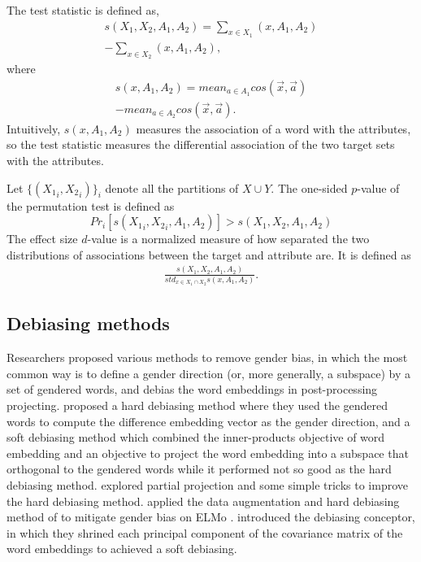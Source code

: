 The test statistic is defined as,
\begin{eqnarray}
s(X_1,X_2,A_1,A_2)=\sum_{x\in X_1}(x,A_1,A_2)\nonumber\\
-\sum_{x\in X_2}(x,A_1,A_2),\nonumber
\end{eqnarray}
where
\begin{eqnarray}
s(x,A_1,A_2)=mean_{a\in A_1}cos(\vec{x},\vec{a})\nonumber\\
-mean_{a\in A_2}cos(\vec{x},\vec{a}).\nonumber
\end{eqnarray}
Intuitively, $s(x,A_1,A_2)$ measures the association of a word with the attributes, so the test statistic measures the differential association of the two target sets with the attributes. 

Let $\{({X_1}_i,{X_2}_i)\}_{i}$ denote all the partitions of $X\cup Y$. The one-sided $p$-value of the permutation test is defined as $$Pr_i[s({X_1}_i,{X_2}_i,A_1,A_2)]>s(X_1,X_2,A_1,A_2)$$
The effect size $d$-value is a normalized measure of how separated the two distributions of associations between the target and attribute are. It is defined as
\begin{eqnarray}
\frac{s(X_1,X_2,A_1,A_2)}{std_{x\in X_1 \cap X_2}s(x,A_1,A_2)}.\nonumber
\end{eqnarray}

\subsection{Debiasing methods}
Researchers proposed various methods to remove gender bias, in which the most common way is to define a gender direction (or, more generally, a subspace) by a set of gendered words, and debias the word embeddings in post-processing projecting. \citet{bolukbasi2016man} proposed a hard debiasing method where they used the gendered words to compute the difference embedding vector as the gender direction, and a soft debiasing method which combined the inner-products objective of word embedding and an objective to project the word embedding into a subspace that orthogonal to the gendered words while it performed not so good as the hard debiasing method. \citet{dev2019attenuating} explored partial projection and some simple tricks to improve the hard debiasing method. \citet{zhao2019gender} applied the data augmentation and hard debiasing method of \citet{bolukbasi2016man} to mitigate gender bias on ELMo \citep{Peters:2018}. \citet{karve2019conceptor} introduced the debiasing conceptor, in which they shrined each principal component of the covariance matrix of the word embeddings to achieved a soft debiasing.

